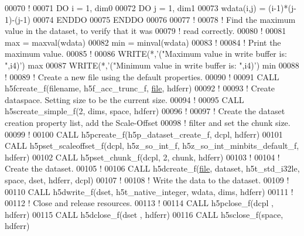 \begin{DoxyCode}
00070   \textcolor{comment}{!}
00071   \textcolor{keywordflow}{DO} i = 1, dim0
00072      \textcolor{keywordflow}{DO} j = 1, dim1
00073         wdata(i,j) = (i-1)*(j-1)-(j-1)
00074 \textcolor{keywordflow}{     ENDDO}
00075 \textcolor{keywordflow}{  ENDDO}
00076 
00077   \textcolor{comment}{!}
00078   \textcolor{comment}{! Find the maximum value in the dataset, to verify that it was}
00079   \textcolor{comment}{! read correctly.}
00080   \textcolor{comment}{!}
00081   max = maxval(wdata)
00082   min = minval(wdata)
00083   \textcolor{comment}{!}
00084   \textcolor{comment}{! Print the maximum value.}
00085   \textcolor{comment}{!}
00086   \textcolor{keyword}{WRITE}(*,\textcolor{stringliteral}{'("Maximum value in write buffer is: ",i4)'}) max
00087   \textcolor{keyword}{WRITE}(*,\textcolor{stringliteral}{'("Minimum value in write buffer is: ",i4)'}) min
00088   \textcolor{comment}{!}
00089   \textcolor{comment}{! Create a new file using the default properties.}
00090   \textcolor{comment}{!}
00091   \textcolor{keyword}{CALL }h5fcreate\_f(filename, h5f\_acc\_trunc\_f, \hyperlink{structfile}{file}, hdferr)
00092   \textcolor{comment}{!}
00093   \textcolor{comment}{! Create dataspace.  Setting size to be the current size.}
00094   \textcolor{comment}{!}
00095   \textcolor{keyword}{CALL }h5screate\_simple\_f(2, dims, space, hdferr)
00096   \textcolor{comment}{!}
00097   \textcolor{comment}{! Create the dataset creation property list, add the Scale-Offset}
00098   \textcolor{comment}{! filter and set the chunk size.}
00099   \textcolor{comment}{!}
00100   \textcolor{keyword}{CALL }h5pcreate\_f(h5p\_dataset\_create\_f, dcpl, hdferr)
00101   \textcolor{keyword}{CALL }h5pset\_scaleoffset\_f(dcpl, h5z\_so\_int\_f, h5z\_so\_int\_minbits\_default\_f, hdferr)
00102   \textcolor{keyword}{CALL }h5pset\_chunk\_f(dcpl, 2, chunk, hdferr)
00103   \textcolor{comment}{!}
00104   \textcolor{comment}{! Create the dataset.}
00105   \textcolor{comment}{!}
00106   \textcolor{keyword}{CALL }h5dcreate\_f(\hyperlink{structfile}{file}, dataset, h5t\_std\_i32le, space, dset, hdferr, dcpl)
00107   \textcolor{comment}{!}
00108   \textcolor{comment}{! Write the data to the dataset.}
00109   \textcolor{comment}{!}
00110   \textcolor{keyword}{CALL }h5dwrite\_f(dset, h5t\_native\_integer, wdata, dims, hdferr)
00111   \textcolor{comment}{!}
00112   \textcolor{comment}{! Close and release resources.}
00113   \textcolor{comment}{!}
00114   \textcolor{keyword}{CALL }h5pclose\_f(dcpl , hdferr)
00115   \textcolor{keyword}{CALL }h5dclose\_f(dset , hdferr)
00116   \textcolor{keyword}{CALL }h5sclose\_f(space, hdferr)

\end{DoxyCode}
